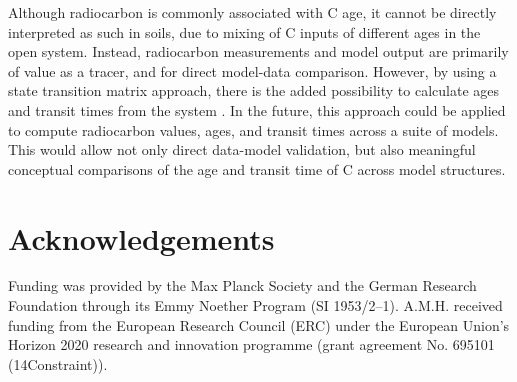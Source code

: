 \documentclass[11pt,a4paper]{article}
\begin{document}
Although radiocarbon is commonly associated with C age, it cannot be directly interpreted as such in soils, due to mixing of C inputs of different ages in the open system. Instead, radiocarbon measurements and model output are primarily of value as a tracer, and for direct model-data comparison. However, by using a state transition matrix approach, there is the added possibility to calculate ages and transit times from the system \citep{Metzler2018PNAS}. In the future, this approach could be applied to compute radiocarbon values, ages, and transit times across a suite of models. This would allow not only direct data-model validation, but also meaningful conceptual comparisons of the age and transit time of C across model structures. 


\section*{Acknowledgements}
Funding was provided by the Max Planck Society and the German Research Foundation through its Emmy Noether Program (SI 1953/2--1). A.M.H. received funding from the European Research Council (ERC) under the European Union’s Horizon 2020 research and innovation programme (grant agreement No. 695101 (14Constraint)).   


%

\end{document}
